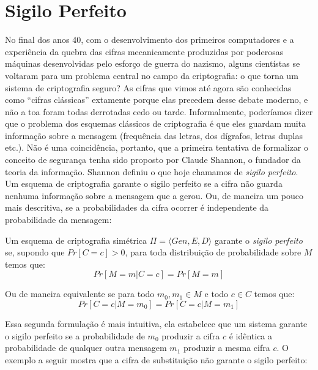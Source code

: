 \chapter{Sigilo Perfeito}
\label{cha:sigilo-perfeito}

No final dos anos 40, com o desenvolvimento dos primeiros computadores e a experiência da quebra das cifras mecanicamente produzidas por poderosas máquinas desenvolvidas pelo esforço de guerra do nazismo, alguns cientístas se voltaram para um problema central no campo da criptografia: o que torna um sistema de criptografia seguro?
As cifras que vimos até agora são conhecidas como ``cifras clássicas'' extamente porque elas precedem desse debate moderno, e não a toa foram todas derrotadas cedo ou tarde.
Informalmente, poderíamos dizer que o problema dos esquemas clássicos de criptografia é que eles guardam muita informação sobre a mensagem (frequência das letras, dos dígrafos, letras duplas etc.). 
Não é uma coincidência, portanto, que a primeira tentativa de formalizar o conceito de segurança tenha sido proposto por Claude Shannon, o fundador da teoria da informação.
Shannon definiu o que hoje chamamos de {\em sigilo perfeito}.
Um esquema de criptografia garante o sigilo perfeito se a cifra não guarda nenhuma informação sobre a mensagem que a gerou.
Ou, de maneira um pouco mais descritiva, se a probabilidades da cifra ocorrer é independente da probabilidade da mensagem:

\begin{definition}
  Um esquema de criptografia simétrica $\Pi = \langle Gen, E, D \rangle$ garante o {\em sigilo perfeito} se, supondo que $Pr[C=c] > 0$, para toda distribuição de probabilidade sobre $M$ temos que:
\begin{displaymath}
  Pr[M = m | C = c] = Pr[M = m]
\end{displaymath}

Ou de maneira equivalente se para todo $m_0, m_1 \in M$ e todo $c \in C$ temos que:
\begin{displaymath}
  Pr[C = c | M = m_0] = Pr[C = c | M = m_1]
\end{displaymath}
\end{definition}

Essa segunda formulação é mais intuitiva, ela estabelece que um sistema garante o sigilo perfeito se a probabilidade de $m_0$ produzir a cifra $c$ é idêntica a probabilidade de qualquer outra mensagem $m_1$ produzir a mesma cifra $c$.
O exemplo a seguir mostra que a cifra de substituição não garante o sigilo perfeito:

